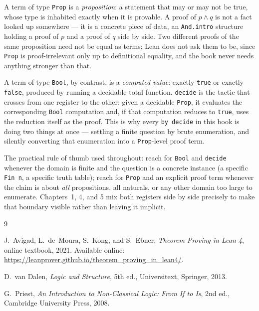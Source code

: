 A term of type \texttt{Prop} is a \emph{proposition}: a statement
that may or may not be true, whose type is inhabited exactly when it
is provable. A proof of $p \land q$ is not a fact looked up
somewhere — it is a concrete piece of data, an \texttt{And.intro}
structure holding a proof of $p$ and a proof of $q$ side by side.
Two different proofs of the same proposition need not be equal as
terms; Lean does not ask them to be, since \texttt{Prop} is
proof-irrelevant only up to definitional equality, and the book never
needs anything stronger than that.

A term of type \texttt{Bool}, by contrast, is a \emph{computed
value}: exactly \texttt{true} or exactly \texttt{false}, produced by
running a decidable total function. \texttt{decide} is the tactic
that crosses from one register to the other: given a decidable
\texttt{Prop}, it evaluates the corresponding \texttt{Bool}
computation and, if that computation reduces to \texttt{true}, uses
the reduction itself as the proof. This is why every
\texttt{by decide} in this book is doing two things at once — settling
a finite question by brute enumeration, and silently converting that
enumeration into a \texttt{Prop}-level proof term.

The practical rule of thumb used throughout: reach for \texttt{Bool}
and \texttt{decide} whenever the domain is finite and the question is
a concrete instance (a specific \texttt{Fin n}, a specific truth
table); reach for \texttt{Prop} and an explicit proof term whenever
the claim is about \emph{all} propositions, all naturals, or any
other domain too large to enumerate. Chapters~1, 4, and 5 mix both
registers side by side precisely to make that boundary visible rather
than leaving it implicit.

\begin{thebibliography}{9}

J.~Avigad, L.~de~Moura, S.~Kong, and S.~Ebner,
\emph{Theorem Proving in Lean 4},
online textbook, 2021.
Available online: \url{https://leanprover.github.io/theorem_proving_in_lean4/}.

D.~van Dalen,
\emph{Logic and Structure}, 5th ed.,
Universitext, Springer, 2013.

G.~Priest,
\emph{An Introduction to Non-Classical Logic: From If to Is}, 2nd ed.,
Cambridge University Press, 2008.

\end{thebibliography}
